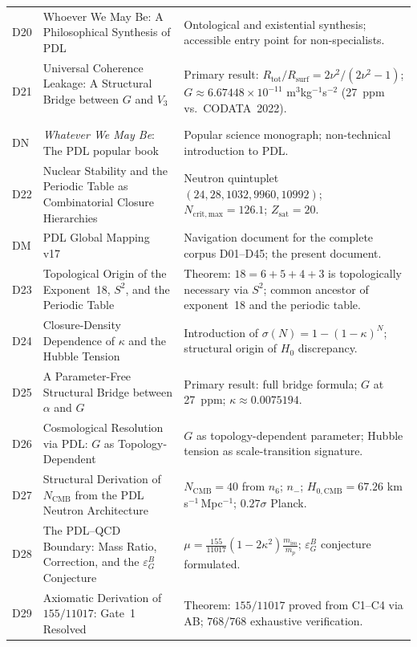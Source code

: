 \documentclass[11pt,a4paper]{article}
\theoremstyle{plain}
\theoremstyle{definition}
\theoremstyle{remark}
\newcommand{\epsGeomB}{\varepsilon_G^B}
\begin{document}
\begin{longtable}{L{1.3cm}L{3.8cm}L{8.0cm}}
D20 & Whoever We May Be: A Philosophical Synthesis of PDL~\cite{D20} & Ontological and existential synthesis; accessible entry point for non-specialists.\\[0.3em]
D21 & Universal Coherence Leakage: A Structural Bridge between $G$ and $V_3$~\cite{D21} & \textcolor{proofblue}{Primary result}: $R_{\mathrm{tot}}/R_{\mathrm{surf}} = 2\nu^2/(2\nu^2-1)$; $G \approx 6.67448\times 10^{-11}$ m$^3$kg$^{-1}$s$^{-2}$ (27~ppm vs.\ CODATA~2022).\\[0.3em]
DN & \emph{Whatever We May Be}: The PDL popular book~\cite{DN} & Popular science monograph; non-technical introduction to PDL.\\[0.3em]
D22 & Nuclear Stability and the Periodic Table as Combinatorial Closure Hierarchies~\cite{D22} & Neutron quintuplet $(24,28,1032,9960,10992)$; $N_{\mathrm{crit,max}}=126.1$; $Z_{\mathrm{sat}}=20$.\\[0.3em]
DM & PDL Global Mapping v17~\cite{DMapv10} & Navigation document for the complete corpus D01--D45; the present document.\\[0.3em]
D23 & Topological Origin of the Exponent~18, $S^2$, and the Periodic Table~\cite{D23} & \textcolor{proofblue}{Theorem}: $18=6+5+4+3$ is topologically necessary via $S^2$; common ancestor of exponent~18 and the periodic table.\\[0.3em]
D24 & Closure-Density Dependence of $\kappa$ and the Hubble Tension~\cite{D24} & Introduction of $\sigma(N)=1-(1-\kappa)^N$; structural origin of $H_0$ discrepancy.\\[0.3em]
D25 & A Parameter-Free Structural Bridge between $\alpha$ and $G$~\cite{D25} & \textcolor{proofblue}{Primary result}: full bridge formula; $G$ at 27~ppm; $\kappa\approx 0.0075194$.\\[0.3em]
D26 & Cosmological Resolution via PDL: $G$ as Topology-Dependent~\cite{D26} & $G$ as topology-dependent parameter; Hubble tension as scale-transition signature.\\[0.3em]
D27 & Structural Derivation of $N_{\mathrm{CMB}}$ from the PDL Neutron Architecture~\cite{D27} & $N_{\mathrm{CMB}}=40$ from $n_6$; $n_{-}$; $H_{0,\mathrm{CMB}}=67.26$ km\,s$^{-1}$\,Mpc$^{-1}$; $0.27\sigma$ Planck.\\[0.3em]
D28 & The PDL--QCD Boundary: Mass Ratio, Correction, and the $\epsGeomB$ Conjecture~\cite{D28} & $\mu = \frac{155}{11017}(1-2\kappa^2)\frac{m_{\mathrm{iso}}}{m_p}$; $\epsGeomB$ conjecture formulated.\\[0.3em]
D29 & Axiomatic Derivation of $155/11017$: Gate~1 Resolved~\cite{D29} & \textcolor{proofblue}{Theorem}: $155/11017$ proved from C1--C4 via AB; $768/768$ exhaustive verification.\\[0.3em]

\end{longtable}
\end{document}
